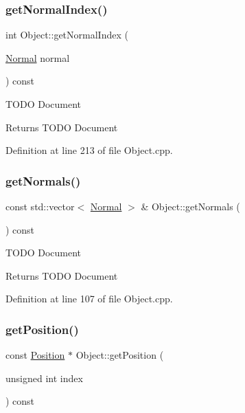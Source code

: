 \mbox{\label{class_object_a877e446e1e1af8bbe11db702221bc194}} 
\subsubsection{\texorpdfstring{get\+Normal\+Index()}{getNormalIndex()}}
{\footnotesize\ttfamily int Object\+::get\+Normal\+Index (\begin{DoxyParamCaption}\item[{\hyperlink{struct_normal}{Normal}}]{normal }\end{DoxyParamCaption}) const}

T\+O\+DO Document \begin{DoxyReturn}{Returns}
T\+O\+DO Document 
\end{DoxyReturn}


Definition at line 213 of file Object.\+cpp.

\mbox{\label{class_object_afc89c45ef455b9e1fc95d49514d48373}} 
\subsubsection{\texorpdfstring{get\+Normals()}{getNormals()}}
{\footnotesize\ttfamily const std\+::vector$<$ \hyperlink{struct_normal}{Normal} $>$ \& Object\+::get\+Normals (\begin{DoxyParamCaption}{ }\end{DoxyParamCaption}) const}

T\+O\+DO Document \begin{DoxyReturn}{Returns}
T\+O\+DO Document 
\end{DoxyReturn}


Definition at line 107 of file Object.\+cpp.

\mbox{\label{class_object_a247968a9aa55c670e2d462876f5e2cb6}} 
\subsubsection{\texorpdfstring{get\+Position()}{getPosition()}}
{\footnotesize\ttfamily const \hyperlink{struct_position}{Position} $\ast$ Object\+::get\+Position (\begin{DoxyParamCaption}\item[{unsigned int}]{index }\end{DoxyParamCaption}) const}

